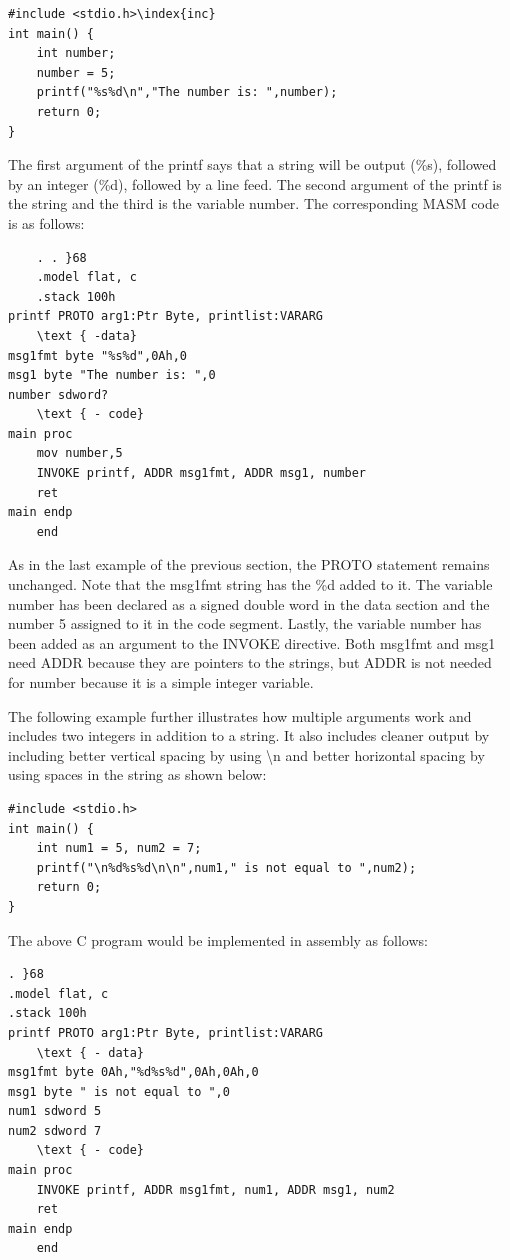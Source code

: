 \documentclass[10pt]{book}
\begin{document}
\begin{verbatim}
#include <stdio.h>\index{inc}
int main() {
    int number;
    number = 5;
    printf("%s%d\n","The number is: ",number);
    return 0;
}
\end{verbatim}

The first argument of the printf says that a string will be output (\%s), followed by an integer (\%d), followed by a line feed. The second argument of the printf is the string and the third is the variable number. The corresponding MASM code is as follows:

\begin{verbatim}
    . . }68
    .model flat, c
    .stack 100h
printf PROTO arg1:Ptr Byte, printlist:VARARG
    \text { -data}
msg1fmt byte "%s%d",0Ah,0
msg1 byte "The number is: ",0
number sdword?
    \text { - code}
main proc
    mov number,5
    INVOKE printf, ADDR msg1fmt, ADDR msg1, number
    ret
main endp
    end
\end{verbatim}

As in the last example of the previous section, the PROTO statement remains unchanged. Note that the msg1fmt string has the \%d added to it. The variable number has been declared as a signed double word in the data section and the number 5 assigned to it in the code segment. Lastly, the variable number has been added as an argument to the INVOKE directive. Both msg1fmt and msg1 need ADDR because they are pointers to the strings, but ADDR is not needed for number because it is a simple integer variable.

The following example further illustrates how multiple arguments work and includes two integers in addition to a string. It also includes cleaner output by including better vertical spacing by using \textbackslash n and better horizontal spacing by using spaces in the string as shown below:

\begin{verbatim}
#include <stdio.h>
int main() {
    int num1 = 5, num2 = 7;
    printf("\n%d%s%d\n\n",num1," is not equal to ",num2);
    return 0;
}
\end{verbatim}

The above C program would be implemented in assembly as follows:


\begin{verbatim}
. }68
.model flat, c
.stack 100h
printf PROTO arg1:Ptr Byte, printlist:VARARG
    \text { - data}
msg1fmt byte 0Ah,"%d%s%d",0Ah,0Ah,0
msg1 byte " is not equal to ",0
num1 sdword 5
num2 sdword 7
    \text { - code}
main proc
    INVOKE printf, ADDR msg1fmt, num1, ADDR msg1, num2
    ret
main endp
    end
\end{verbatim}
\end{document}

